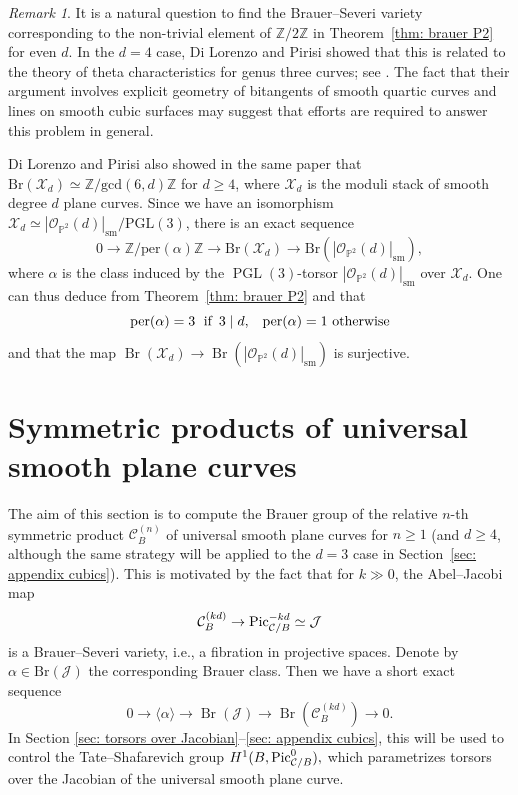 \documentclass[11pt]{amsart}
\theoremstyle{plain}
\theoremstyle{definition}
\theoremstyle{remark}
\newtheorem{rmk}[thm]{Remark}
\DeclareMathOperator{\Br}{Br}
\newcommand{\Pic}{\mathop{\rm Pic}\nolimits}
\DeclareMathOperator{\PGL}{PGL}
\begin{document}
\begin{rmk}\label{rmk: finding Brauer-Severi}
    It is a natural question to find the Brauer--Severi variety corresponding to the non-trivial element of $\mathbb Z/2\mathbb Z$ in Theorem~\ref{thm: brauer P2} for even $d$. In the $d=4$ case, Di Lorenzo and Pirisi showed that this is related to the theory of theta characteristics for genus three curves; see \cite[Proposition~4.4,~Corollary~4.18] {DiLorenzo-Pirisi}. The fact that their argument involves explicit geometry of bitangents of smooth quartic curves and lines on smooth cubic surfaces may suggest that efforts are required to answer this problem in general.

    Di Lorenzo and Pirisi also showed in the same paper that $\mathrm{Br}(\mathcal{X}_d) \simeq \mathbb Z/\mathrm{gcd}(6,d)\mathbb Z$ for $d\geq 4$, where $\mathcal{X}_d$ is the moduli stack of smooth degree $d$ plane curves. Since we have an isomorphism $\mathcal{X}_d \simeq |\mathcal{O}_{\mathbb P^2}(d)|_\mathrm{sm}/\mathrm{PGL}(3)$, there is an exact sequence
    \[
    0\to \mathbb Z/\mathrm{per}(\alpha)\mathbb Z \to \mathrm{Br}(\mathcal{X}_d) \to \mathrm{Br}(|\mathcal{O}_{\mathbb P^2}(d)|_\mathrm{sm}),
    \]
    where $\alpha$ is the class induced by the $\PGL(3)$-torsor $|\mathcal{O}_{\mathbb P^2}(d)|_\mathrm{sm}$ over $\mathcal{X}_d$. One can thus deduce from Theorem~\ref{thm: brauer P2} and \cite[Theorem~1.3]{DiLorenzo-Pirisi} that
    \[
    \mathrm{per}(\alpha) = 3 \;\textrm{ if \,} 3\mid d, \quad \! \mathrm{per}(\alpha)= 1 \textrm{ otherwise}
    \]
    and that the map $\Br(\mathcal X_d) \to \Br(|\mathcal O_{\mathbb P^2}(d)|_{\mathrm{sm}})$ is surjective.
\end{rmk}



\section{Symmetric products of universal smooth plane curves} \label{sec: symmetric products}

The aim of this section is to compute the Brauer group of the relative $n$-th symmetric product $\mathcal{C}_B^{(n)}$ of universal smooth plane curves for $n\geq 1$ (and $d\geq 4$, although the same strategy will be applied to the $d=3$ case in Section~\ref{sec: appendix cubics}). This is motivated by the fact that for $k \gg 0$, the Abel--Jacobi map
$$\mathcal C_{B}^{(kd)} \to \Pic^{-kd}_{\mathcal C/ B} \simeq \mathcal J$$
is a Brauer--Severi variety, i.e., a fibration in projective spaces. Denote by $\alpha\in \mathrm{Br}(\mathcal{J})$ the corresponding Brauer class. Then we have a short exact sequence 
$$0 \to \langle \alpha\rangle \to \Br(\mathcal J) \to \Br(\mathcal C^{(kd)}_B) \to 0.$$
In Section \ref{sec: torsors over Jacobian}--\ref{sec: appendix cubics}, this will be used to control the Tate--Shafarevich group $H^1(B, \Pic^0_{\mathcal C/ B}),$ which parametrizes torsors over the Jacobian of the universal smooth plane curve.
\end{document}

